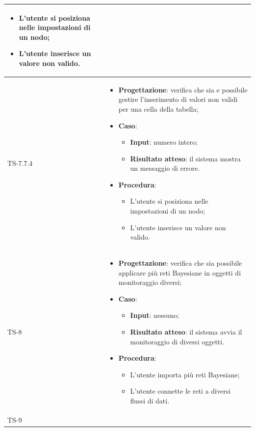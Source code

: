 \begin{longtable}{|C{2.5cm}|C{13cm}|}
\begin{itemize}
	\begin{itemize}
		\item L'utente si posiziona nelle impostazioni di un nodo;
		\item L'utente inserisce un valore non valido.
	\end{itemize} 
\end{itemize}
	 \\
	\hline
	{TS-7.7.4} & 
\begin{itemize}
	\item \textbf{Progettazione}: verifica che sia e possibile gestire
	l'inserimento di valori non validi per una cella della tabella;
	\item \textbf{Caso}: 
	\begin{itemize}
		\item \textbf{Input}: numero intero;
		\item \textbf{Risultato atteso}: il sistema mostra un messaggio di errore.
	\end{itemize}
\item \textbf{Procedura}:
\begin{itemize}
\item L'utente si posiziona nelle impostazioni di un nodo;
\item L'utente inserisce un valore non valido.
\end{itemize} 
\end{itemize}
\\
\hline
	{TS-8} & 
\begin{itemize}
	\item \textbf{Progettazione}: verifica che sia possibile applicare più reti
	Bayesiane in oggetti di monitoraggio diversi;
	\item \textbf{Caso}: 
	\begin{itemize}
		\item \textbf{Input}: nessuno;
		\item \textbf{Risultato atteso}: il sistema avvia il monitoraggio di diversi oggetti.
	\end{itemize}
	\item \textbf{Procedura}:
	\begin{itemize}
		\item L'utente importa più reti Bayesiane;
		\item L'utente connette le reti a diversi flussi di dati.
	\end{itemize} 
\end{itemize} \\
\hline
	{TS-9} &
\begin{itemize}

\end{itemize}
\end{longtable}

